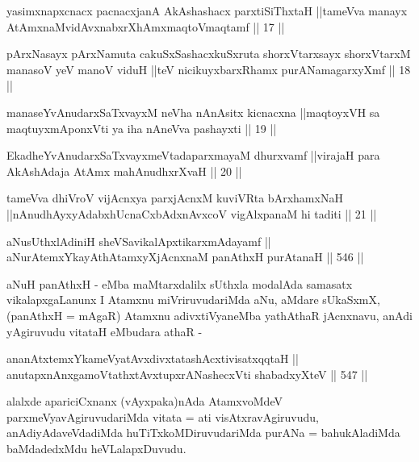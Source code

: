\begin{kandikeshl}
yasimxnapxcnacx pacnacxjanA AkAshashacx parxtiSiThxtaH ||tameVva manayx AtAmxnaM\break vidAvxnabxrXhAmxmaqtoV\s maqtamf || 17 ||
\end{kandikeshl}

\begin{kandikeshl}
pArxNasayx pArxNamuta cakuSxSashacxkuSxruta shorxVtarxsayx shorxVtarxM manasoV yeV manoV viduH ||teV nicikuyxbarxRhamx purANamagarxyXmf || 18 ||
\end{kandikeshl}

\begin{kandikeshl}
manaseYvAnudarxSaTxvayxM neVha nAnAsitx kicnacxna ||maqtoyxVH sa maqtuyxmAponxVti ya iha nAneVva pashayxti || 19 ||
\end{kandikeshl}

\begin{kandikeshl}
EkadheYvAnudarxSaTxvayxmeVtadaparxmayaM dhurxvamf ||virajaH para AkAshAdaja AtAmx mahAnudhxrXvaH || 20 ||
\end{kandikeshl}

\begin{kandikeshl}
tameVva dhiVroV vijAcnxya parxjAcnxM kuviVRta bArxhamxNaH ||\break nAnudhAyxyAdabxhUcnaCxbAdxnAvxcoV vigAlxpanaM hi taditi || 21 ||
\end{kandikeshl}



\begin{shl}
aNusUthxlAdiniH sheVSavikalApxtikarxmAdayamf || \\
aNurAtemxYkayAthAtamxyXjAcnxnaM panAthxH purAtanaH \hfill || 546 ||  
\end{shl}

\begin{artha}
aNuH panAthxH - eMba maMtarxdalilx sUthxla modalAda samasatx
vikalapxgaLanunx I Atamxnu miVriruvudariMda aNu, aMdare sUkaSxmX,
(panAthxH = mAgaR) Atamxnu adivxtiVyaneMba yathAthaR jAcnxnavu, anAdi
yAgiruvudu vitataH eMbudara athaR -
\end{artha}

\begin{shl}
ananAtxtemxYkameVyatAvxdivxtatashAcxtivisatxqqtaH || \\
anutapxnAnxgamoVtathxtAvxtupxrANashecxVti shabadxyXteV \hfill || 547 ||  
\end{shl}

\begin{artha}
alalxde apariciCxnanx (vAyxpaka)nAda AtamxvoMdeV
parxmeVyavAgiruvudariMda vitata = ati visAtxravAgiruvudu,
anAdiyAdaveVdadiMda huTiTxkoMDiruvudariMda purANa = bahukAladiMda\break
baMdadedxMdu heVLalapxDuvudu.
\end{artha}

